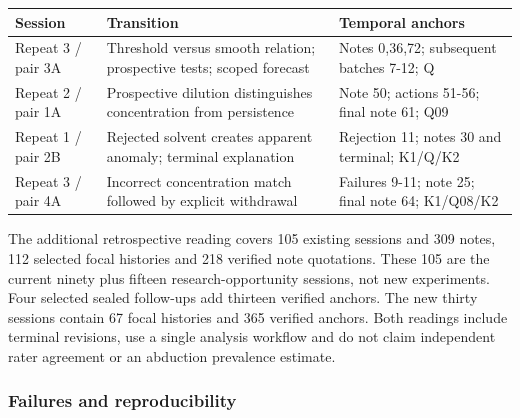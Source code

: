 \documentclass[10pt,a4paper]{article}
\begin{document}
{\def\LTcaptype{table} %
\small\begin{longtable}[]{@{}
  >{\raggedright\arraybackslash}p{}
  >{\raggedright\arraybackslash}p{}
  >{\raggedright\arraybackslash}p{}@{}}
\toprule\noalign{}
\begin{minipage}[b]{\linewidth}\raggedright
Session
\end{minipage} & \begin{minipage}[b]{\linewidth}\raggedright
Transition
\end{minipage} & \begin{minipage}[b]{\linewidth}\raggedright
Temporal anchors
\end{minipage} \\
\midrule\noalign{}
\endhead
\bottomrule\noalign{}
\endlastfoot
Repeat 3 / pair 3A & Threshold versus smooth relation; prospective tests; scoped forecast & Notes 0,36,72; subsequent batches 7-12; Q \\
Repeat 2 / pair 1A & Prospective dilution distinguishes concentration from persistence & Note 50; actions 51-56; final note 61; Q09 \\
Repeat 1 / pair 2B & Rejected solvent creates apparent anomaly; terminal explanation & Rejection 11; notes 30 and terminal; K1/Q/K2 \\
Repeat 3 / pair 4A & Incorrect concentration match followed by explicit withdrawal & Failures 9-11; note 25; final note 64; K1/Q08/K2 \\
\end{longtable}\normalsize
}

The additional retrospective reading covers 105 existing sessions and 309 notes, 112 selected focal histories and 218 verified note quotations. These 105 are the current ninety plus fifteen research-opportunity sessions, not new experiments. Four selected sealed follow-ups add thirteen verified anchors. The new thirty sessions contain 67 focal histories and 365 verified anchors. Both readings include terminal revisions, use a single analysis workflow and do not claim independent rater agreement or an abduction prevalence estimate.

\subsubsection{Failures and reproducibility}\label{failures-and-reproducibility}
\end{document}
